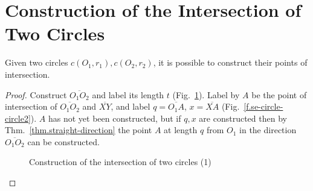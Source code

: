 \newpage

\section{Construction of the Intersection of Two Circles}\label{s.two-circles}

\begin{theorem}
Given two circles $c(O_1,r_1), c(O_2,r_2)$, it is possible to construct their points of intersection.
\end{theorem}

\begin{proof}
Construct $\overline{O_1O_2}$ and label its length $t$ (Fig.~\ref{f.se-circle-circle1}).
Label by $A$ be the point of intersection of $\overline{O_1O_2}$ and $\overline{XY}$, and label $q=\overline{O_1A}$, $x=\overline{XA}$ (Fig.~\ref{f.se-circle-circle2}). $A$ has not yet been constructed, but if $q,x$ are constructed then by Thm.~\ref{thm.straight-direction} the point $A$ at length $q$ from $O_1$ in the direction $\overline{O_1O_2}$ can be constructed.

\begin{figure}[t]
\begin{center}
\end{center}
\caption{Construction of the intersection of two circles (1)}\label{f.se-circle-circle1}
\end{figure}


\end{proof}
